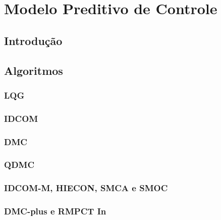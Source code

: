 \chapter{Modelo Preditivo de Controle}
\label{ch:mpc}

\section{Introdução}


\section{Algoritmos}


\subsection{LQG}


\subsection{IDCOM}


\subsection{DMC}


\subsection{QDMC}


\subsection{IDCOM-M, HIECON, SMCA e SMOC}


\subsection{DMC-plus e RMPCT In}

